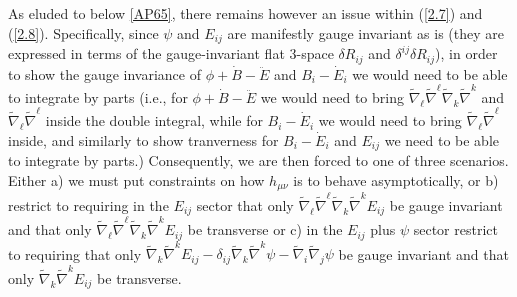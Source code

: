 As eluded to below \eqref{AP65}, there remains however an issue within (\ref{2.7}) and (\ref{2.8}). Specifically, since $\psi$ and $E_{ij}$ are manifestly gauge invariant as is (they are expressed in terms of the gauge-invariant flat 3-space $\delta R_{ij}$ and $\delta^{ij}\delta R_{ij}$), in order to show the gauge invariance of $\phi+\dot{B}-\ddot{E}$ and $B_i -\dot{E}_i$ we would need to be able to integrate by parts (i.e., for $\phi+\dot{B}-\ddot{E}$  we would need to bring $\tilde{\nabla}_{\ell}\tilde{\nabla}^{\ell} \tilde{\nabla}_k\tilde{\nabla}^k$ and $\tilde{\nabla}_{\ell}\tilde{\nabla}^{\ell}$ inside the double integral, while for $B_i-\dot{E}_i$ we would need to bring $\tilde{\nabla}_{\ell}\tilde{\nabla}^{\ell}$ inside, and similarly to show tranverness for $B_i -\dot{E}_i$ and $E_{ij}$ we need to be able to integrate by parts.) Consequently, we are then forced to one of three scenarios. Either a) we must put constraints on how $h_{\mu\nu}$ is to behave asymptotically, or b) restrict to requiring in the $E_{ij}$ sector that only $\tilde{\nabla}_{\ell}\tilde{\nabla}^{\ell}\tilde{\nabla}_k\tilde{\nabla}^kE_{ij}$ be gauge invariant and that only $\tilde{\nabla}_{\ell}\tilde{\nabla}^{\ell}\tilde{\nabla}_k\tilde{\nabla}^kE_{ij}$ be transverse or c) in the $E_{ij}$ plus $\psi$ sector restrict to requiring that only $\tilde{\nabla}_k\tilde{\nabla}^kE_{ij}-\delta_{ij}\tilde{\nabla}_k\tilde{\nabla}^k\psi-\tilde{\nabla}_i\tilde{\nabla}_j\psi$ be gauge invariant and that only $\tilde{\nabla}_k\tilde{\nabla}^kE_{ij}$ be transverse. 


